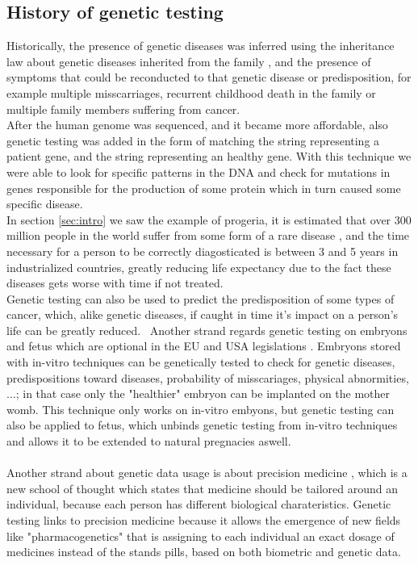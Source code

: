 \documentclass[12pt]{article}
\begin{document}
\subsection{History of genetic testing}
Historically, the presence of genetic diseases was inferred using the inheritance law about genetic diseases inherited from the family \cite{understanding_genetics}, and the presence of symptoms that could be reconducted to that genetic disease or predisposition, for example multiple misscarriages, recurrent childhood death in the family or multiple family members suffering from cancer.\\
After the human genome was sequenced, and it became more affordable, also genetic testing was added in the form of matching the string representing a patient gene, and the string representing an healthy gene. With this technique we were able to look for specific patterns in the DNA and check for mutations in genes responsible for the production of some protein which in turn caused some specific disease.\\
In section \ref{sec:intro} we saw the example of progeria, it is estimated that over 300 million people in the world suffer from some form of a rare disease \cite{rare_disease}, 
and the time necessary for a person to be correctly diagosticated is between 3 and 5 years in industrialized countries, greatly reducing life expectancy due to the fact these diseases gets worse with time if not treated.\\
Genetic testing can also be used to predict the predisposition of some types of cancer, which, alike genetic diseases, if caught in time it's impact on a person's life can be greatly reduced. \cite{economy_genome}\
Another strand regards genetic testing on embryons and fetus which are optional in the EU and USA legislations \cite{prenatal_testing}. Embryons stored with in-vitro techniques can be genetically tested to check for genetic diseases,
 predispositions toward diseases, probability of misscariages, physical abnormities, $\dots$; in that case only the "healthier" embryon can be implanted on the mother womb. 
 This technique only works on in-vitro embyons, but genetic testing can also be applied to fetus, which unbinds genetic testing from in-vitro techniques and allows it to be extended to natural pregnacies aswell. \cite{economy_genome}\\
 \\
 Another strand about genetic data usage is about precision medicine \cite{economy_genome}, which is a new school of thought which states that medicine should be tailored around an individual, 
 because each person has different biological charateristics. Genetic testing links to precision medicine because it allows the emergence of new fields like "pharmacogenetics" 
 that is assigning to each individual an exact dosage of medicines instead of the stands pills, based on both biometric and genetic data.
\end{document}
